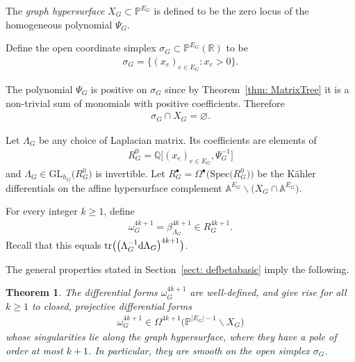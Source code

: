 \documentclass[pdftex]{sigma}%
\newtheorem{thm}{Theorem}[section]
\numberwithin{equation}{section}
\newcommand{\Q}{\mathbb Q}
\newcommand{\R}{\mathbb R}
\newcommand{\Pro}{\mathbb P}
\newcommand{\GL}{\mathrm{GL}}
\newcommand{\0}{\color{blue}{\mathsf{0}}}
\begin{document}
\begin{defn}The \emph{graph hypersurface} $X_G \subset \Pro^{E_G}$ is defined \cite{BEK} to be the zero locus of the homogeneous polynomial $\Psi_G$.

Define the open coordinate simplex $\sigma_G \subset \Pro^{E_G}(\R)$ to be
\begin{gather*}
 \sigma_G = \{ (x_e)_{e \in E_G}\colon x_e >0 \} .
 \end{gather*}
\end{defn}


The polynomial $\Psi_G$ is positive on $\sigma_G$
 since by Theorem~\ref{thm: MatrixTree} it
 is a non-trivial sum of monomials with positive coefficients. Therefore
 \begin{gather*}
 \sigma_G \cap X_G = \varnothing.
 \end{gather*}




 Let $\Lambda_G$ be any choice of Laplacian matrix. Its coefficients are elements of
 \begin{gather*}
 R_G^0= \Q \big[(x_e)_{e\in E_G}, \Psi_G^{-1}\big]
 \end{gather*}
 and $\Lambda_G \in \GL_{h_G} \big(R_G^0\big)$ is invertible.
 Let $R_G^{\bullet}= \Omega^{\bullet} \big( \mathrm{Spec}\big(R_G^0\big)\big)$
 be the K\"ahler differentials on the affine hypersurface complement $\mathbb{A}^{E_G} \backslash \big(X_G \cap \mathbb{A}^{E_G}\big)$.

 \begin{defn} For every integer $k\geq 1$, define
\begin{gather*} %
\omega^{4k+1}_G = \beta_{\Lambda_G}^{4k+1} \in R_G^{4k+1} .
\end{gather*}
Recall that this equals $ \mathrm{tr} \big( \big( \Lambda_G^{-1} {\rm d} \Lambda_G\big)^{4k+1} \big)$.
\end{defn}

The general properties stated in Section~\ref{sect: defbetabasic} imply the following.
\begin{thm} \label{cor: omegaprojective} The differential forms $\omega^{4k+1}_G$ are well-defined, and give rise for all $k\geq 1$ to closed, projective differential forms
\begin{gather*}
\omega^{4k+1}_G \in \Omega^{4k+1}\big( \Pro^{|E_G|-1} \backslash X_G\big)
\end{gather*}
whose singularities lie along the graph hypersurface, where they have a pole of order at most $k+1$. In particular, they are smooth on the open simplex $\sigma_G$.
\end{thm}
\end{document}
